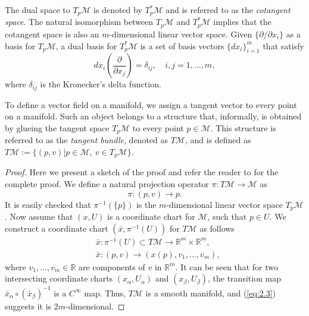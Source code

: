 The dual space to $T_p\mathcal M$ is denoted by $T_p^*\mathcal M$ and is referred to as the \emph{cotangent space}. The natural isomorphism between $T_p\mathcal M$ and $T_p^*\mathcal M$ implies that the cotangent space is also an $m$-dimensional linear vector space. Given $\{ \partial /\partial x_i \}$ as a basis for $T_p\mathcal M$, a dual basis for $T_p^*\mathcal M$ is a set of basis vectors $\{ dx_i \}_{i=1}^{m}$ that satisfy
\begin{equation} \label{eq:2.13}
	dx_i(\frac{\partial}{\partial x_j}) = \delta_{ij}, \quad i,j=1,\dots,m,
\end{equation}
where $\delta_{ij}$ is the Kronecker's delta function.

To define a vector field on a manifold, we assign a tangent vector to every point on a manifold. Such an object belongs to a structure that, informally, is obtained by glueing the tangent space $T_p\mathcal M$ to every point $p\in \mathcal M$. This structure is referred to as the \emph{tangent bundle}, denoted as $T \mathcal M$, and is defined as $T \mathcal M := \{ (p,v) | p\in \mathcal M, \ v \in T_p \mathcal M\}$.

\begin{proof}
Here we present a sketch of the proof and refer the reader to \cite{abraham1978foundations} for the complete proof. We define a natural projection operator $\pi:T\mathcal M \to \mathcal M$ as
\begin{equation} \label{eq:2.2}
	\pi : (p,v) \to p.
\end{equation}
It is easily checked that $\pi^{-1}(\{p\})$ is the $m$-dimensional linear vector space $T_{p} \mathcal M$. Now assume that $(x,U)$ is a coordinate chart for $\mathcal M$, such that $p\in U$. We construct a coordinate chart $(\bar x , \pi^{-1}(U) )$ for $T\mathcal M$ as follows 
\begin{equation} \label{eq:2.3}
	\begin{aligned}
		&\bar x : \pi^{-1}(U) \subset T \mathcal M \to \mathbb R^m \times \mathbb R^m, \\
		&\bar x : (p,v) \to (x(p),v_1,\dots,v_m),
	\end{aligned}
\end{equation}
where $v_1,\dots,v_m\in \mathbb R$ are components of $v$ in $\mathbb R^m$. It can be seen that for two intersecting coordinate charts $(x_\alpha,U_\alpha)$ and $(x_\beta, U_\beta)$, the transition map $\bar x_{\alpha} \circ (\bar x_\beta)^{-1}$ is a $C^{\infty}$ map. Thus, $T \mathcal M$ is a smooth manifold, and (\ref{eq:2.3}) suggests it is $2m$-dimensional.
\end{proof}

